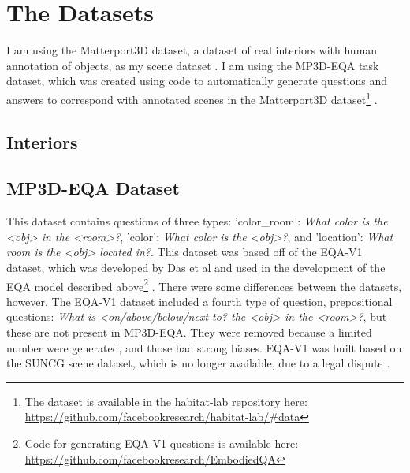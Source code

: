 

\section{The Datasets}
I am using the Matterport3D dataset, a dataset of real interiors with human annotation of objects, as my scene dataset \cite{matterport}. 
I am using the MP3D-EQA task dataset, which was created using code to automatically generate questions and answers to correspond with annotated scenes in the Matterport3D dataset\footnote{The dataset is available in the habitat-lab repository here: \url{https://github.com/facebookresearch/habitat-lab/#data}} \cite{eqa_matterport}. 


\subsection{Interiors}

\subsection{MP3D-EQA Dataset} 
This dataset contains questions of three types: 'color\_room': \emph{What color is the <obj> in the <room>?}, 'color': \emph{What color is the <obj>?}, and 'location': \emph{What room is the <obj> located in?}. This dataset was based off of the EQA-V1 dataset, which was developed by Das et al and used in the development of the EQA model described above\footnote{Code for generating EQA-V1 questions is available here: \url{https://github.com/facebookresearch/EmbodiedQA}} \cite{embodiedqa}. There were some differences between the datasets, however. The EQA-V1 dataset included a fourth type of question, prepositional questions: \emph{What is <on/above/below/next to? the <obj> in the <room>?}, but these are not present in MP3D-EQA. They were removed because a limited number were generated, and those had strong biases. %
EQA-V1 was built based on the SUNCG scene dataset, which is no longer available, due to a legal dispute \cite{planner5d}. %

